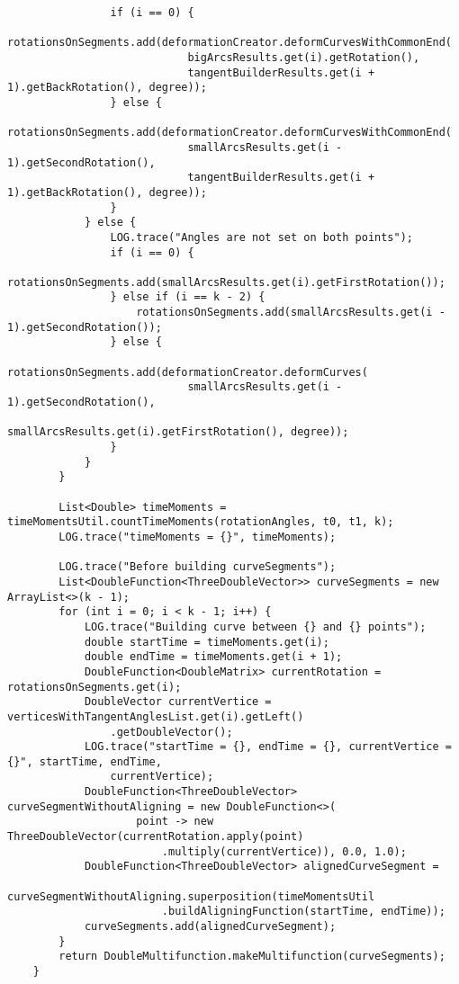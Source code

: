 \begin{verbatim}
                if (i == 0) {
                    rotationsOnSegments.add(deformationCreator.deformCurvesWithCommonEnd(
                            bigArcsResults.get(i).getRotation(),
                            tangentBuilderResults.get(i + 1).getBackRotation(), degree));
                } else {
                    rotationsOnSegments.add(deformationCreator.deformCurvesWithCommonEnd(
                            smallArcsResults.get(i - 1).getSecondRotation(),
                            tangentBuilderResults.get(i + 1).getBackRotation(), degree));
                }
            } else {
                LOG.trace("Angles are not set on both points");
                if (i == 0) {
                    rotationsOnSegments.add(smallArcsResults.get(i).getFirstRotation());
                } else if (i == k - 2) {
                    rotationsOnSegments.add(smallArcsResults.get(i - 1).getSecondRotation());
                } else {
                    rotationsOnSegments.add(deformationCreator.deformCurves(
                            smallArcsResults.get(i - 1).getSecondRotation(),
                            smallArcsResults.get(i).getFirstRotation(), degree));
                }
            }
        }

        List<Double> timeMoments = timeMomentsUtil.countTimeMoments(rotationAngles, t0, t1, k);
        LOG.trace("timeMoments = {}", timeMoments);

        LOG.trace("Before building curveSegments");
        List<DoubleFunction<ThreeDoubleVector>> curveSegments = new ArrayList<>(k - 1);
        for (int i = 0; i < k - 1; i++) {
            LOG.trace("Building curve between {} and {} points");
            double startTime = timeMoments.get(i);
            double endTime = timeMoments.get(i + 1);
            DoubleFunction<DoubleMatrix> currentRotation = rotationsOnSegments.get(i);
            DoubleVector currentVertice = verticesWithTangentAnglesList.get(i).getLeft()
                .getDoubleVector();
            LOG.trace("startTime = {}, endTime = {}, currentVertice = {}", startTime, endTime,
                currentVertice);
            DoubleFunction<ThreeDoubleVector> curveSegmentWithoutAligning = new DoubleFunction<>(
                    point -> new ThreeDoubleVector(currentRotation.apply(point)
                        .multiply(currentVertice)), 0.0, 1.0);
            DoubleFunction<ThreeDoubleVector> alignedCurveSegment =
                    curveSegmentWithoutAligning.superposition(timeMomentsUtil
                        .buildAligningFunction(startTime, endTime));
            curveSegments.add(alignedCurveSegment);
        }
        return DoubleMultifunction.makeMultifunction(curveSegments);
    }


\end{verbatim}
